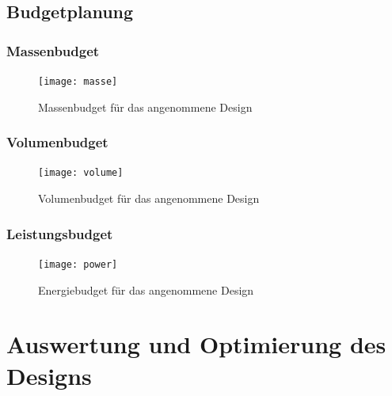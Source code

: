 				\subsection{Budgetplanung}
				
						\subsubsection{Massenbudget}
								
										\begin{figure}[!h]
											\centering
												\texttt{[image: masse]}
											\caption{Massenbudget für das angenommene Design}
											\label{fig:masse}
										\end{figure}
										
						\subsubsection{Volumenbudget}
								
										\begin{figure}[!h]
											\centering
												\texttt{[image: volume]}
											\caption{Volumenbudget für das angenommene Design}
											\label{fig:volume}
										\end{figure}
								
						\subsubsection{Leistungsbudget}
				
										\begin{figure}[!h]
											\centering
												\texttt{[image: power]}
											\caption{Energiebudget für das angenommene Design}
											\label{fig:power}
										\end{figure}
										
			\section{Auswertung und Optimierung des Designs}

				
